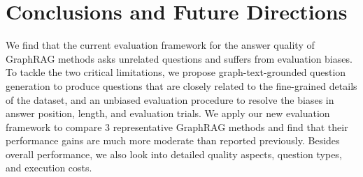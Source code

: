\section{Conclusions and Future Directions}




We find that the current evaluation framework for the answer quality of GraphRAG methods asks unrelated questions and suffers from evaluation biases. To tackle the two critical limitations, we propose graph-text-grounded question generation to produce questions that are closely related to the fine-grained details of the dataset, and an unbiased evaluation procedure to resolve the biases in answer position, length, and evaluation trials. We apply our new evaluation framework to compare 3 representative GraphRAG methods and find that their performance gains are much more moderate than reported previously. Besides overall performance, we also look into detailed quality aspects, question types, and execution costs.

